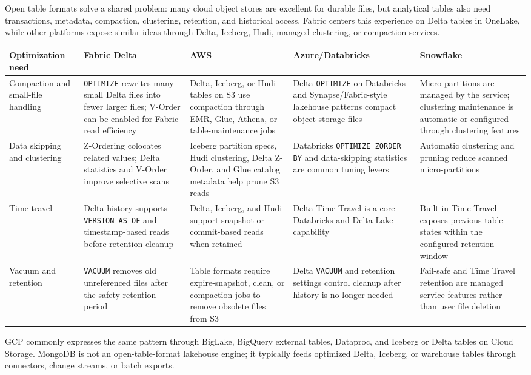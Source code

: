 \begin{crosscloud}
Open table formats solve a shared problem: many cloud object stores are excellent for durable files, but analytical tables also need transactions, metadata, compaction, clustering, retention, and historical access. Fabric centers this experience on Delta tables in OneLake, while other platforms expose similar ideas through Delta, Iceberg, Hudi, managed clustering, or compaction services.

\vspace{2mm}
{\footnotesize
\begin{tabular}{@{}p{2.8cm}p{3.2cm}p{3.2cm}p{3.2cm}p{3.2cm}@{}}
\toprule
\textbf{Optimization need} & \textbf{Fabric Delta} & \textbf{AWS} & \textbf{Azure/Databricks} & \textbf{Snowflake} \\
\midrule
Compaction and small-file handling & \texttt{OPTIMIZE} rewrites many small Delta files into fewer larger files; V-Order can be enabled for Fabric read efficiency & Delta, Iceberg, or Hudi tables on S3 use compaction through EMR, Glue, Athena, or table-maintenance jobs & Delta \texttt{OPTIMIZE} on Databricks and Synapse/Fabric-style lakehouse patterns compact object-storage files & Micro-partitions are managed by the service; clustering maintenance is automatic or configured through clustering features \\
Data skipping and clustering & Z-Ordering colocates related values; Delta statistics and V-Order improve selective scans & Iceberg partition specs, Hudi clustering, Delta Z-Order, and Glue catalog metadata help prune S3 reads & Databricks \texttt{OPTIMIZE ZORDER BY} and data-skipping statistics are common tuning levers & Automatic clustering and pruning reduce scanned micro-partitions \\
Time travel & Delta history supports \texttt{VERSION AS OF} and timestamp-based reads before retention cleanup & Delta, Iceberg, and Hudi support snapshot or commit-based reads when retained & Delta Time Travel is a core Databricks and Delta Lake capability & Built-in Time Travel exposes previous table states within the configured retention window \\
Vacuum and retention & \texttt{VACUUM} removes old unreferenced files after the safety retention period & Table formats require expire-snapshot, clean, or compaction jobs to remove obsolete files from S3 & Delta \texttt{VACUUM} and retention settings control cleanup after history is no longer needed & Fail-safe and Time Travel retention are managed service features rather than user file deletion \\
\bottomrule
\end{tabular}}

\vspace{1mm}
GCP commonly expresses the same pattern through BigLake, BigQuery external tables, Dataproc, and Iceberg or Delta tables on Cloud Storage. MongoDB is not an open-table-format lakehouse engine; it typically feeds optimized Delta, Iceberg, or warehouse tables through connectors, change streams, or batch exports.
\end{crosscloud}


